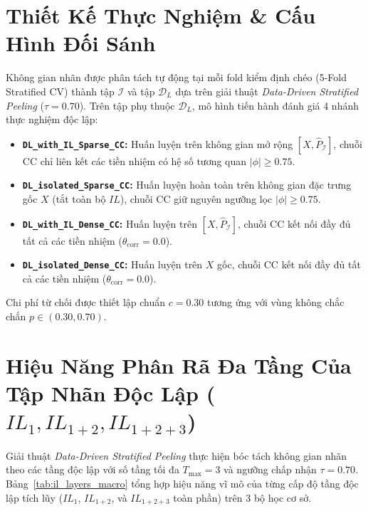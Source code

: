 \documentclass[11pt,a4paper]{article}
\begin{document}
\section{Thiết Kế Thực Nghiệm \& Cấu Hình Đối Sánh}
Không gian nhãn được phân tách tự động tại mỗi fold kiểm định chéo (5-Fold Stratified CV) thành tập $\mathcal{I}$ và tập $\mathcal{D}_L$ dựa trên giải thuật \textit{Data-Driven Stratified Peeling} ($\tau = 0.70$). Trên tập phụ thuộc $\mathcal{D}_L$, mô hình tiến hành đánh giá 4 nhánh thực nghiệm độc lập:
\begin{itemize}[leftmargin=*]
  \item \textbf{\texttt{DL\_with\_IL\_Sparse\_CC}:} Huấn luyện trên không gian mở rộng $[X, \hat{P}_{\mathcal{I}}]$, chuỗi CC chỉ liên kết các tiền nhiệm có hệ số tương quan $|\phi| \ge 0.75$.
  \item \textbf{\texttt{DL\_isolated\_Sparse\_CC}:} Huấn luyện hoàn toàn trên không gian đặc trưng gốc $X$ (tắt toàn bộ $IL$), chuỗi CC giữ nguyên ngưỡng lọc $|\phi| \ge 0.75$.
  \item \textbf{\texttt{DL\_with\_IL\_Dense\_CC}:} Huấn luyện trên $[X, \hat{P}_{\mathcal{I}}]$, chuỗi CC kết nối đầy đủ tất cả các tiền nhiệm ($\theta_{\text{corr}} = 0.0$).
  \item \textbf{\texttt{DL\_isolated\_Dense\_CC}:} Huấn luyện trên $X$ gốc, chuỗi CC kết nối đầy đủ tất cả các tiền nhiệm ($\theta_{\text{corr}} = 0.0$).
\end{itemize}

Chi phí từ chối được thiết lập chuẩn $c = 0.30$ tương ứng với vùng không chắc chắn $p \in (0.30, 0.70)$.

\section{\texorpdfstring{Hiệu Năng Phân Rã Đa Tầng Của Tập Nhãn Độc Lập ($IL_1, IL_{1+2}, IL_{1+2+3}$)}{Hiệu Năng Phân Rã Đa Tầng Của Tập Nhãn Độc Lập (IL1, IL1+2, IL1+2+3)}}
Giải thuật \textit{Data-Driven Stratified Peeling} thực hiện bóc tách không gian nhãn theo các tầng độc lập với số tầng tối đa $T_{\max} = 3$ và ngưỡng chấp nhận $\tau = 0.70$. Bảng~\ref{tab:il_layers_macro} tổng hợp hiệu năng vĩ mô của từng cấp độ tầng độc lập tích lũy ($IL_1$, $IL_{1+2}$, và $IL_{1+2+3}$ toàn phần) trên 3 bộ học cơ sở.
\end{document}
